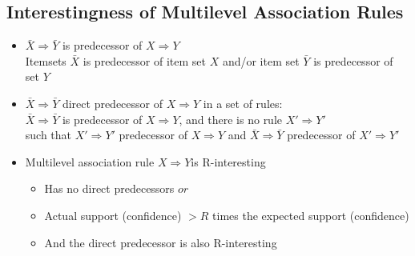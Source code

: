 \documentclass{article}
\begin{document}
\subsection{Interestingness of Multilevel Association Rules}
\begin{itemize}
  \item $\bar{X} \Rightarrow \bar{Y}$ is predecessor of $X \Rightarrow Y$ \\ 
  Itemsets $\bar{X}$ is predecessor of item set $X$ and/or item set $\bar{Y}$ is predecessor of set $Y$

  \item $\bar{X} \Rightarrow \bar{Y}$ direct predecessor of $X \Rightarrow Y$ in a set of rules: \\
  $\bar{X} \Rightarrow \bar{Y}$ is predecessor of $X \Rightarrow Y$, and there is no rule $X' \Rightarrow Y'$ \\
  such that $X' \Rightarrow Y'$ predecessor of $X \Rightarrow Y$ and $\bar{X} \Rightarrow \bar{Y}$ predecessor of $X' \Rightarrow Y'$

  \item Multilevel association rule $X \Rightarrow Y$is R-interesting
  \begin{itemize} 
    \item Has no direct predecessors $or$
    \item Actual support (confidence) $ > R$ times the expected support (confidence)
    \item And the direct predecessor is also R-interesting
  \end{itemize}

\end{itemize}
\end{document}

